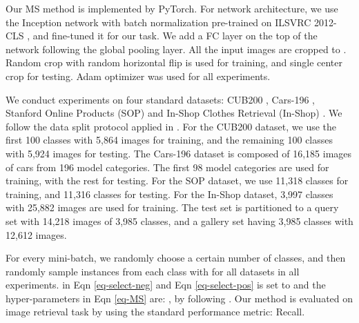 \documentclass[10pt,twocolumn,letterpaper]{article}
\begin{document}
\label{experiments-section}
Our MS method is implemented by PyTorch. For network architecture, we use the Inception network with batch normalization \cite{batchnorm} pre-trained on ILSVRC 2012-CLS \cite{ILSVRC15},  and fine-tuned it for our task. We add a FC layer on the top of the network following the global pooling layer.
All the input images are cropped to .  Random crop with random horizontal flip is used for training, and single center crop for testing. Adam optimizer was used for all experiments.

We conduct experiments on four standard datasets:  CUB200 \cite{CUB_200_2011}, Cars-196 \cite{car-196}, Stanford Online Products (SOP) \cite{lifted-structured-loss} and In-Shop Clothes Retrieval (In-Shop) \cite{DeepFashion}.
We follow the data split protocol applied in \cite{lifted-structured-loss}.
For the CUB200 dataset, we use the first 100 classes
with 5,864 images for training, and the remaining 100 classes with 5,924
images for testing. 
The Cars-196 dataset is composed of 16,185 images of cars from 196 model categories.
The first 98 model categories are used for training, with the rest for testing.
For the SOP dataset, we use 11,318 classes for training, and 11,316 classes for testing. 
For the In-Shop dataset, 3,997 classes with 25,882 images are used for training.
The test set is partitioned to a query set with 14,218 images of 3,985 classes, and a gallery set having  3,985 classes with 12,612 images.

For every mini-batch, we randomly choose a certain number of classes, and then randomly sample  instances from each class with  for all datasets in all experiments.  in Eqn \ref{eq-select-neg} and Eqn \ref{eq-select-pos} is set to   and the hyper-parameters in Eqn \ref{eq-MS} are: , by following \cite{histogram}. 
Our method is evaluated on image retrieval task by using the standard performance metric: Recall.
\end{document}
